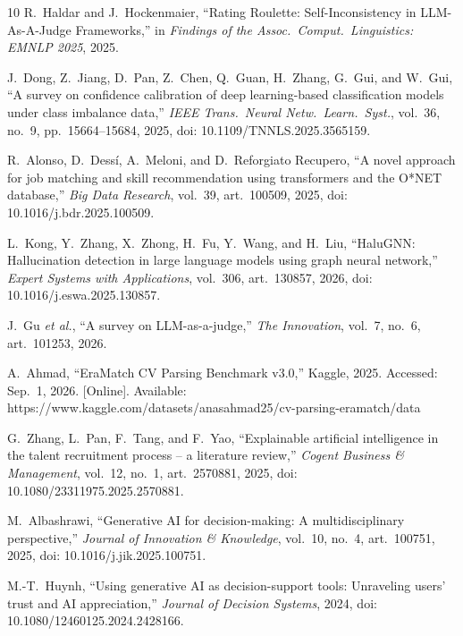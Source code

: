 \documentclass[journal]{IEEEtran}
\begin{document}
\begin{thebibliography}{10}
R.~Haldar and J.~Hockenmaier, ``Rating Roulette: Self-Inconsistency in LLM-As-A-Judge Frameworks,'' in \emph{Findings of the Assoc.\ Comput.\ Linguistics: EMNLP 2025}, 2025.

J.~Dong, Z.~Jiang, D.~Pan, Z.~Chen, Q.~Guan, H.~Zhang, G.~Gui, and W.~Gui, ``A survey on confidence calibration of deep learning-based classification models under class imbalance data,'' \emph{IEEE Trans.\ Neural Netw.\ Learn.\ Syst.}, vol.~36, no.~9, pp.~15664--15684, 2025, doi: 10.1109/TNNLS.2025.3565159.

R.~Alonso, D.~Dess\'i, A.~Meloni, and D.~Reforgiato Recupero, ``A novel approach for job matching and skill recommendation using transformers and the O*NET database,'' \emph{Big Data Research}, vol.~39, art.~100509, 2025, doi: 10.1016/j.bdr.2025.100509.

L.~Kong, Y.~Zhang, X.~Zhong, H.~Fu, Y.~Wang, and H.~Liu, ``HaluGNN: Hallucination detection in large language models using graph neural network,'' \emph{Expert Systems with Applications}, vol.~306, art.~130857, 2026, doi: 10.1016/j.eswa.2025.130857.

J.~Gu \emph{et al.}, ``A survey on LLM-as-a-judge,'' \emph{The Innovation}, vol.~7, no.~6, art.\ 101253, 2026.

A.~Ahmad, ``EraMatch CV Parsing Benchmark v3.0,'' Kaggle, 2025. Accessed: Sep.~1, 2026. [Online]. Available: https://www.kaggle.com/datasets/anasahmad25/cv-parsing-eramatch/data

G.~Zhang, L.~Pan, F.~Tang, and F.~Yao, ``Explainable artificial intelligence in the talent recruitment process -- a literature review,'' \emph{Cogent Business \& Management}, vol.~12, no.~1, art.~2570881, 2025, doi: 10.1080/23311975.2025.2570881.

M.~Albashrawi, ``Generative AI for decision-making: A multidisciplinary perspective,'' \emph{Journal of Innovation \& Knowledge}, vol.~10, no.~4, art.~100751, 2025, doi: 10.1016/j.jik.2025.100751.

M.-T.~Huynh, ``Using generative AI as decision-support tools: Unraveling users' trust and AI appreciation,'' \emph{Journal of Decision Systems}, 2024, doi: 10.1080/12460125.2024.2428166.

\end{thebibliography}
\end{document}

